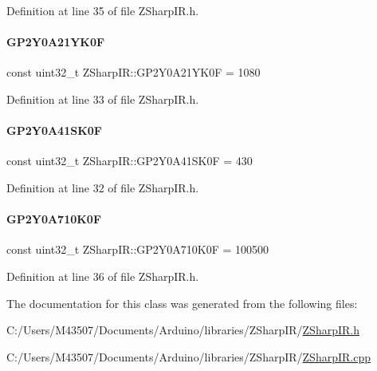Definition at line 35 of file Z\+Sharp\+I\+R.\+h.

\mbox{\label{class_z_sharp_i_r_aa079c6041afab95db89c14a179fdfff1}} 
\paragraph{\texorpdfstring{G\+P2\+Y0\+A21\+Y\+K0F}{GP2Y0A21YK0F}}
{\footnotesize\ttfamily const uint32\+\_\+t Z\+Sharp\+I\+R\+::\+G\+P2\+Y0\+A21\+Y\+K0F = 1080\hspace{0.3cm}{\ttfamily [static]}}



Definition at line 33 of file Z\+Sharp\+I\+R.\+h.

\mbox{\label{class_z_sharp_i_r_a26dafed1122d774ee033e9ab10387a0e}} 
\paragraph{\texorpdfstring{G\+P2\+Y0\+A41\+S\+K0F}{GP2Y0A41SK0F}}
{\footnotesize\ttfamily const uint32\+\_\+t Z\+Sharp\+I\+R\+::\+G\+P2\+Y0\+A41\+S\+K0F = 430\hspace{0.3cm}{\ttfamily [static]}}



Definition at line 32 of file Z\+Sharp\+I\+R.\+h.

\mbox{\label{class_z_sharp_i_r_a06fb0d712f9124a1d9a5183bd4e5c2b4}} 
\paragraph{\texorpdfstring{G\+P2\+Y0\+A710\+K0F}{GP2Y0A710K0F}}
{\footnotesize\ttfamily const uint32\+\_\+t Z\+Sharp\+I\+R\+::\+G\+P2\+Y0\+A710\+K0F = 100500\hspace{0.3cm}{\ttfamily [static]}}



Definition at line 36 of file Z\+Sharp\+I\+R.\+h.



The documentation for this class was generated from the following files\+:\begin{DoxyCompactItemize}
\item 
C\+:/\+Users/\+M43507/\+Documents/\+Arduino/libraries/\+Z\+Sharp\+I\+R/\mbox{\hyperlink{_z_sharp_i_r_8h}{Z\+Sharp\+I\+R.\+h}}\item 
C\+:/\+Users/\+M43507/\+Documents/\+Arduino/libraries/\+Z\+Sharp\+I\+R/\mbox{\hyperlink{_z_sharp_i_r_8cpp}{Z\+Sharp\+I\+R.\+cpp}}\end{DoxyCompactItemize}
